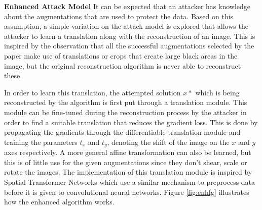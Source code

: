 


\textbf{Enhanced Attack Model}
It can be expected that an attacker has knowledge about the augmentations that are used to protect the data. Based on this assumption, a simple variation on the attack model is explored that allows the attacker to learn a translation along with the reconstruction of an image. This is inspired by the observation that all the successful augmentations selected by the paper make use of translations or crops that create large black areas in the image, but the original reconstruction algorithm is never able to reconstruct these.

In order to learn this translation, the attempted solution $x*$ which is being reconstructed by the algorithm is first put through a translation module. This module can be fine-tuned during the reconstruction process by the attacker in order to find a suitable translation that reduces the gradient loss. This is done by propagating the gradients through the differentiable translation module and training the parameters $t_x$ and $t_y$, denoting the shift of the image on the $x$ and $y$ axes respectively. A more general affine transformation can also be learned, but this is of little use for the given augmentations since they don't shear, scale or rotate the images. The implementation of this translation module is inspired by Spatial Transformer Networks \cite{jaderberg2015spatial} which use a similar mechanism to preprocess data before it is given to convolutional neural networks. Figure \ref{fig:enhfg} illustrates how the enhanced algorithm works.

